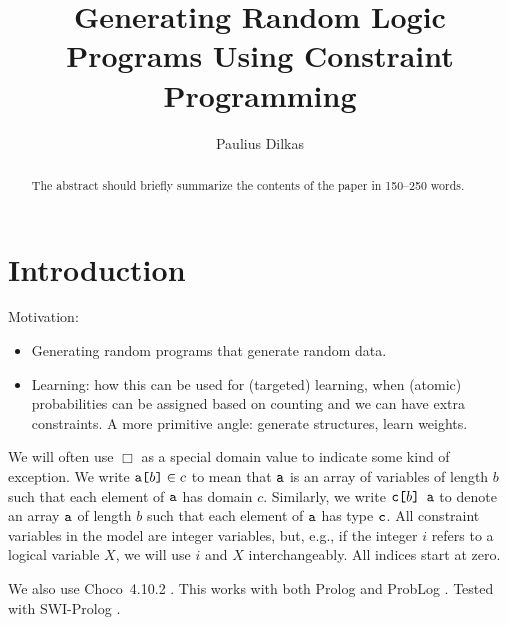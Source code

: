 \documentclass[runningheads]{llncs}
\newcommand{\variable}[1]{\texttt{\textup{#1}}}
\newcommand{\arrayd}[3]{\variable{{#1}[}{#2}\variable{]} \in {#3}}
\newcommand{\arrayt}[3]{\variable{{#3}[}{#2}\variable{] {#1}}}
\begin{document}
\title{Generating Random Logic Programs Using Constraint Programming}
\author{Paulius Dilkas}

\maketitle

\begin{abstract}
The abstract should briefly summarize the contents of the paper in
150--250 words.

\end{abstract}

\section{Introduction}

Motivation:
\begin{itemize}
\item Generating random programs that generate random data.
\item Learning: how this can be used for (targeted) learning, when (atomic)
  probabilities can be assigned based on counting and we can have extra
  constraints. A more primitive angle: generate structures, learn weights.
\end{itemize}

We will often use $\Box$ as a special domain value to indicate some kind of
exception. We write $\arrayd{a}{b}{c}$ to mean that
$\variable{a}$ is an array of variables of length $b$ such that each element of
$\variable{a}$ has domain $c$. Similarly, we write $\arrayt{a}{b}{c}$ to denote
an array $\variable{a}$ of length $b$ such that each element of $\variable{a}$
has type $\variable{c}$. All constraint variables in the model are integer
variables, but, e.g., if the integer $i$ refers to a logical variable $X$, we
will use $i$ and $X$ interchangeably. All indices start at zero.

We also use Choco~4.10.2 \cite{choco}. This works with both Prolog
\cite{DBLP:books/daglib/0041598} and ProbLog \cite{DBLP:conf/ijcai/RaedtKT07}.
Tested with SWI-Prolog \cite{DBLP:journals/tplp/WielemakerSTL12}.
\end{document}
